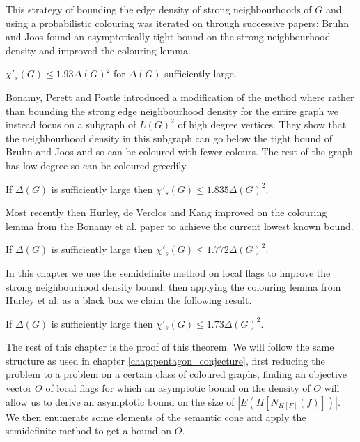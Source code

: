 This strategy of bounding the edge density of strong neighbourhoods of $G$ and
using a probabilistic colouring was iterated on through successive papers:
Bruhn and Joos found an asymptotically tight bound on the strong neighbourhood density
and improved the colouring lemma.
\begin{knowntheorem}
    $\chi'_s(G) \leq 1.93\Delta(G)^2$ for $\Delta(G)$ sufficiently large.
\end{knowntheorem}
Bonamy, Perett and Postle introduced a modification of the method where rather than
bounding the strong edge neighbourhood density for the entire graph we instead focus
on a subgraph of $L(G)^2$ of high degree vertices. They show that the
neighbourhood density in this subgraph can go below the tight bound of Bruhn and Joos
and so can be coloured with fewer colours. The rest of the graph has low degree so can
be coloured greedily.

\begin{knowntheorem}
    If $\Delta(G)$ is sufficiently large then
    $\chi'_s(G) \leq 1.835\Delta(G)^2$.
\end{knowntheorem}

Most recently then Hurley, de Verclos and Kang improved on the colouring lemma from the
Bonamy et al. paper to achieve the current lowest known bound.
\begin{knowntheorem}
    If $\Delta(G)$ is sufficiently large then
    $\chi'_s(G) \leq 1.772\Delta(G)^2$.
\end{knowntheorem}

In this chapter we use the semidefinite method on local flags to improve the strong
neighbourhood density bound, then applying the colouring lemma from Hurley et al. as a black
box we claim the following result.

\begin{theorem}
    \label{thm:strong_edge_colouring_bound}
    If $\Delta(G)$ is sufficiently large then $\chi'_s(G) \leq 1.73\Delta(G)^2$.
\end{theorem}

The rest of this chapter is the proof of this theorem.
We will follow the same structure as used in chapter \ref{chap:pentagon_conjecture},
first reducing the problem to a problem on a certain class of coloured graphs,
finding an objective vector $O$ of local flags for which an asymptotic bound on the density of $O$ will allow
us to derive an asymptotic bound on the size of $|E(H[N_{H[F]}(f)])|$.
We then enumerate some elements
of the semantic cone and apply the semidefinite method to get a bound on $O$.

